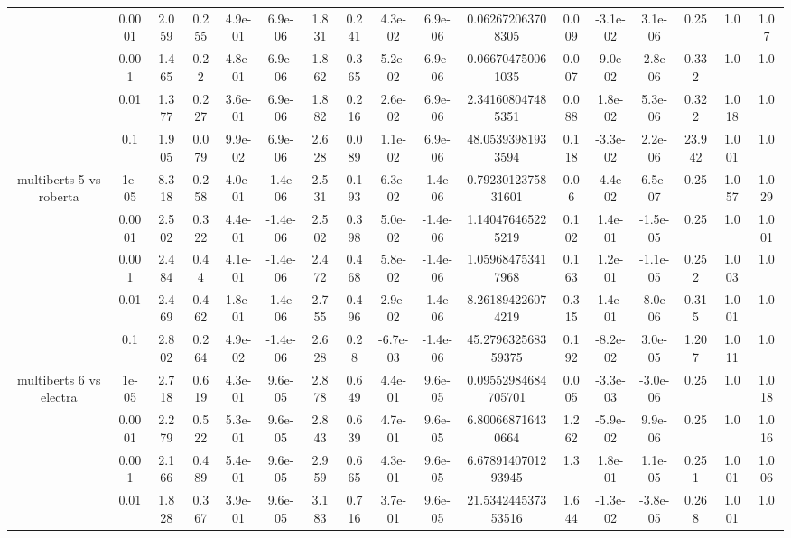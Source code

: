 \begin{tabular}{|c|c|c|c|c|c|c|c|c|c|c|c|c|c|c|c|c|}
 & 0.0001 & 2.059 & 0.255 & 4.9e-01 & 6.9e-06 & 1.831 & 0.241 & 4.3e-02 & 6.9e-06 & 0.062672063708305 & 0.009 & -3.1e-02 & 3.1e-06 & 0.25 & 1.0 & 1.07 \\
 & 0.001 & 1.465 & 0.22 & 4.8e-01 & 6.9e-06 & 1.862 & 0.365 & 5.2e-02 & 6.9e-06 & 0.066704750061035 & 0.007 & -9.0e-02 & -2.8e-06 & 0.332 & 1.0 & 1.0 \\
 & 0.01 & 1.377 & 0.227 & 3.6e-01 & 6.9e-06 & 1.882 & 0.216 & 2.6e-02 & 6.9e-06 & 2.341608047485351 & 0.088 & 1.8e-02 & 5.3e-06 & 0.322 & 1.018 & 1.0 \\
 & 0.1 & 1.905 & 0.079 & 9.9e-02 & 6.9e-06 & 2.628 & 0.089 & 1.1e-02 & 6.9e-06 & 48.05393981933594 & 0.118 & -3.3e-02 & 2.2e-06 & 23.942 & 1.001 & 1.0 \\
\hline
\multirow{5}{*}{multiberts 5 vs roberta } & 1e-05 & 8.318 & 0.258 & 4.0e-01 & -1.4e-06 & 2.531 & 0.193 & 6.3e-02 & -1.4e-06 & 0.7923012375831601 & 0.06 & -4.4e-02 & 6.5e-07 & 0.25 & 1.057 & 1.029 \\
 & 0.0001 & 2.502 & 0.322 & 4.4e-01 & -1.4e-06 & 2.502 & 0.398 & 5.0e-02 & -1.4e-06 & 1.140476465225219 & 0.102 & 1.4e-01 & -1.5e-05 & 0.25 & 1.0 & 1.001 \\
 & 0.001 & 2.484 & 0.44 & 4.1e-01 & -1.4e-06 & 2.472 & 0.468 & 5.8e-02 & -1.4e-06 & 1.059684753417968 & 0.163 & 1.2e-01 & -1.1e-05 & 0.252 & 1.003 & 1.0 \\
 & 0.01 & 2.469 & 0.462 & 1.8e-01 & -1.4e-06 & 2.755 & 0.496 & 2.9e-02 & -1.4e-06 & 8.261894226074219 & 0.315 & 1.4e-01 & -8.0e-06 & 0.315 & 1.001 & 1.0 \\
 & 0.1 & 2.802 & 0.264 & 4.9e-02 & -1.4e-06 & 2.628 & 0.28 & -6.7e-03 & -1.4e-06 & 45.279632568359375 & 0.192 & -8.2e-02 & 3.0e-05 & 1.207 & 1.011 & 1.0 \\
\hline
\multirow{5}{*}{multiberts 6 vs electra } & 1e-05 & 2.718 & 0.619 & 4.3e-01 & 9.6e-05 & 2.878 & 0.649 & 4.4e-01 & 9.6e-05 & 0.09552984684705701 & 0.005 & -3.3e-03 & -3.0e-06 & 0.25 & 1.0 & 1.018 \\
 & 0.0001 & 2.279 & 0.522 & 5.3e-01 & 9.6e-05 & 2.843 & 0.639 & 4.7e-01 & 9.6e-05 & 6.800668716430664 & 1.262 & -5.9e-02 & 9.9e-06 & 0.25 & 1.0 & 1.016 \\
 & 0.001 & 2.166 & 0.489 & 5.4e-01 & 9.6e-05 & 2.959 & 0.665 & 4.3e-01 & 9.6e-05 & 6.6789140701293945 & 1.3 & 1.8e-01 & 1.1e-05 & 0.251 & 1.001 & 1.006 \\
 & 0.01 & 1.828 & 0.367 & 3.9e-01 & 9.6e-05 & 3.183 & 0.716 & 3.7e-01 & 9.6e-05 & 21.534244537353516 & 1.644 & -1.3e-02 & -3.8e-05 & 0.268 & 1.001 & 1.0 \\

\end{tabular}
